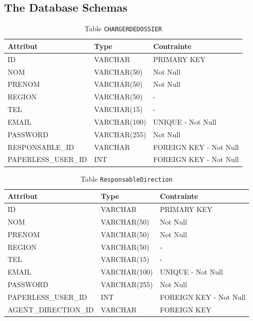 \subsection{The Database Schemas}
\begin{table}[h!]
\centering
\begin{tabular}{|l|l|l|}
\hline
\textbf{Attribut} & \textbf{Type} & \textbf{Contrainte} \\
\hline
ID & VARCHAR & PRIMARY KEY \\
NOM & VARCHAR(50) & Not Null \\
PRENOM & VARCHAR(50) & Not Null \\
REGION & VARCHAR(50) & - \\
TEL & VARCHAR(15) & - \\
EMAIL & VARCHAR(100) & UNIQUE - Not Null \\
PASSWORD & VARCHAR(255) & Not Null \\
RESPONSABLE\_ID & VARCHAR & FOREIGN KEY - Not Null \\
PAPERLESS\_USER\_ID & INT & FOREIGN KEY - Not Null \\
\hline
\end{tabular}
\caption{Table \texttt{CHARGERDEDOSSIER}}
\end{table}
\begin{table}[h!]
\centering
\begin{tabular}{|l|l|l|}
\hline
\textbf{Attribut} & \textbf{Type} & \textbf{Contrainte} \\
\hline
ID & VARCHAR & PRIMARY KEY \\
NOM & VARCHAR(50) & Not Null \\
PRENOM & VARCHAR(50) & Not Null \\
REGION & VARCHAR(50) & - \\
TEL & VARCHAR(15) & - \\
EMAIL & VARCHAR(100) & UNIQUE - Not Null \\
PASSWORD & VARCHAR(255) & Not Null \\
PAPERLESS\_USER\_ID & INT & FOREIGN KEY - Not Null \\
AGENT\_DIRECTION\_ID & VARCHAR & FOREIGN KEY \\
\hline
\end{tabular}
\caption{Table \texttt{ResponsableDirection}}
\end{table}
\clearpage
